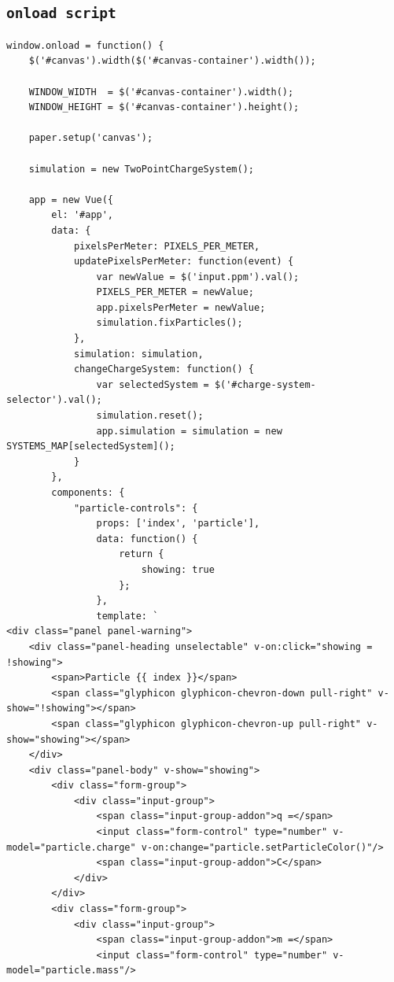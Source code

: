 \documentclass[11pt]{article}
\begin{document}
\subsection{\texttt{onload script}}
\label{sec-8-9}
\begin{verbatim}
window.onload = function() {
    $('#canvas').width($('#canvas-container').width());

    WINDOW_WIDTH  = $('#canvas-container').width();
    WINDOW_HEIGHT = $('#canvas-container').height();

    paper.setup('canvas');

    simulation = new TwoPointChargeSystem();

    app = new Vue({
        el: '#app',
        data: {
            pixelsPerMeter: PIXELS_PER_METER,
            updatePixelsPerMeter: function(event) {
                var newValue = $('input.ppm').val();
                PIXELS_PER_METER = newValue;
                app.pixelsPerMeter = newValue;
                simulation.fixParticles();
            },
            simulation: simulation,
            changeChargeSystem: function() {
                var selectedSystem = $('#charge-system-selector').val();
                simulation.reset();
                app.simulation = simulation = new SYSTEMS_MAP[selectedSystem]();
            }
        },
        components: {
            "particle-controls": {
                props: ['index', 'particle'],
                data: function() {
                    return {
                        showing: true
                    };
                },
                template: `
<div class="panel panel-warning">
    <div class="panel-heading unselectable" v-on:click="showing = !showing">
        <span>Particle {{ index }}</span>
        <span class="glyphicon glyphicon-chevron-down pull-right" v-show="!showing"></span>
        <span class="glyphicon glyphicon-chevron-up pull-right" v-show="showing"></span>
    </div>
    <div class="panel-body" v-show="showing">
        <div class="form-group">
            <div class="input-group">
                <span class="input-group-addon">q =</span>
                <input class="form-control" type="number" v-model="particle.charge" v-on:change="particle.setParticleColor()"/>
                <span class="input-group-addon">C</span>
            </div>
        </div>
        <div class="form-group">
            <div class="input-group">
                <span class="input-group-addon">m =</span>
                <input class="form-control" type="number" v-model="particle.mass"/>

\end{verbatim}
\end{document}
